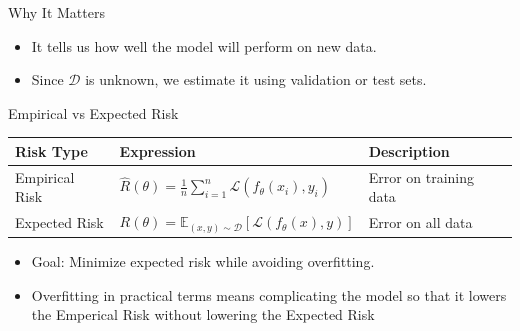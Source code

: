 \documentclass[aspectratio=169]{beamer}
\begin{document}
\begin{frame}[label={sec:orge3b7af3}]{Why It Matters}
\begin{itemize}
\item It tells us how well the model will perform \alert{on new data}.
\item Since \(\mathcal{D}\) is unknown, we estimate it using validation or test sets.
\end{itemize}
\end{frame}

\begin{frame}[label={sec:org8c0c23d}]{Empirical vs Expected Risk}
\begin{center}
\begin{tabular}{lll}
Risk Type & Expression & Description\\[0pt]
\hline
Empirical Risk & \(\hat{R}(\theta) = \frac{1}{n} \sum_{i=1}^{n} \mathcal{L}(f_\theta(x_i), y_i)\) & Error on training data\\[0pt]
Expected Risk & \(R(\theta) = \mathbb{E}_{(x,y) \sim \mathcal{D}} [\mathcal{L}(f_\theta(x), y)]\) & Error on all data\\[0pt]
\end{tabular}
\end{center}

\begin{itemize}
\item Goal: Minimize expected risk while avoiding overfitting.
\item Overfitting in practical terms means complicating the model so
that it lowers the Emperical Risk without lowering the Expected Risk
\end{itemize}
\end{frame}
\end{document}
